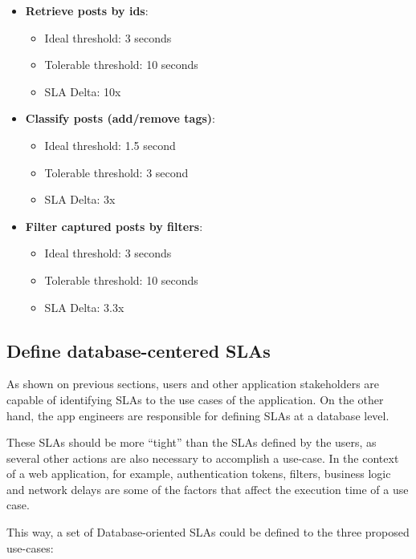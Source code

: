 \begin{itemize}
	\item{\textbf{Retrieve posts by ids}:
		\begin{itemize}
		\item{Ideal threshold: 3 seconds}
		\item{Tolerable threshold: 10 seconds}
		\item{SLA Delta: 10x}
		\end{itemize}
	}

	\item{\textbf{Classify posts (add/remove tags)}:
		\begin{itemize}
		\item{Ideal threshold: 1.5 second}
		\item{Tolerable threshold: 3 second}
		\item{SLA Delta: 3x}
		\end{itemize}
	}

	\item{\textbf{Filter captured posts by filters}:
		\begin{itemize}
		\item{Ideal threshold: 3 seconds}
		\item{Tolerable threshold: 10 seconds}
		\item{SLA Delta: 3.3x}
		\end{itemize}
	}

	\end{itemize}

\clearpage
\subsection{Define database-centered SLAs}
As shown on previous sections, users and other application stakeholders are capable of identifying SLAs to the use cases of the application. On the other hand, the app engineers are responsible for defining SLAs at a database level. 

These SLAs should be more ``tight'' than the SLAs defined by the users, as several other actions are also necessary to accomplish a use-case. In the context of a web application, for example, authentication tokens, filters, business logic and network delays are some of the factors that affect the execution time of a use case. 

This way, a set of Database-oriented SLAs could be defined to the three proposed use-cases: 

